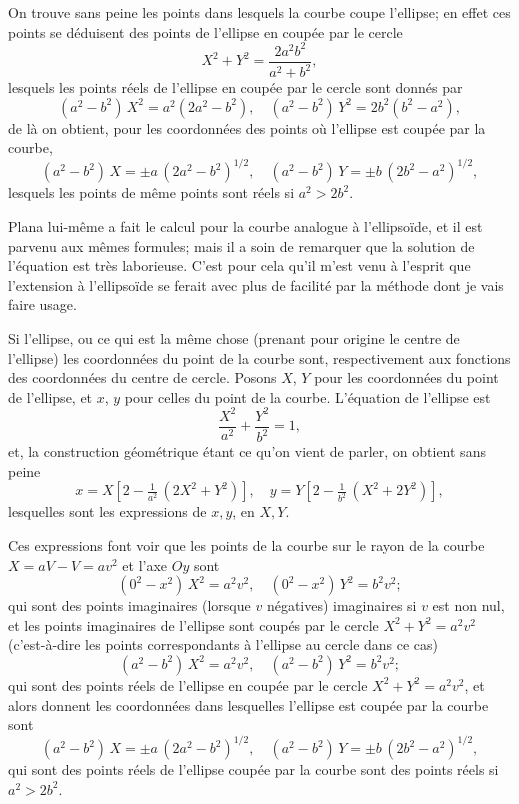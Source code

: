 \documentclass[11pt,a4paper]{article}
\begin{document}
On trouve sans peine les points dans lesquels la courbe coupe l'ellipse; en effet ces points se déduisent des points de l'ellipse en coupée par le cercle
\[
X^2 + Y^2 = \frac{2a^2b^2}{a^2+b^2},
\]
lesquels les points réels de l'ellipse en coupée par le cercle sont donnés par
\[
(a^2-b^2)\,X^2 = a^2(2a^2-b^2),\quad (a^2-b^2)\,Y^2 = 2b^2(b^2-a^2),
\]
de là on obtient, pour les coordonnées des points où l'ellipse est coupée par la courbe,
\[
(a^2-b^2)\,X = \pm a\,(2a^2-b^2)^{1/2},\quad (a^2-b^2)\,Y = \pm b\,(2b^2-a^2)^{1/2},
\]
lesquels les points de même points sont réels si $a^2 > 2b^2$.

Plana lui-même a fait le calcul pour la courbe analogue à l'ellipsoïde, et il est parvenu aux mêmes formules; mais il a soin de remarquer que la solution de l'équation est très laborieuse. C'est pour cela qu'il m'est venu à l'esprit que l'extension à l'ellipsoïde se ferait avec plus de facilité par la méthode dont je vais faire usage.

\setcounter{page}{124}

Si l'ellipse, ou ce qui est la même chose (prenant pour origine le centre de l'ellipse) les coordonnées du point de la courbe sont, respectivement aux fonctions des coordonnées du centre de cercle. Posons $X$, $Y$ pour les coordonnées du point de l'ellipse, et $x$, $y$ pour celles du point de la courbe. L'équation de l'ellipse est
\[
\frac{X^2}{a^2} + \frac{Y^2}{b^2} = 1,
\]
et, la construction géométrique étant ce qu'on vient de parler, on obtient sans peine
\[
x = X\left[2-\tfrac{1}{a^2}\,(2X^2+Y^2)\right],\quad y = Y\left[2-\tfrac{1}{b^2}\,(X^2+2Y^2)\right],
\]
lesquelles sont les expressions de $x, y$, en $X, Y$.

Ces expressions font voir que les points de la courbe sur le rayon de la courbe $X = aV - V = av^2$ et l'axe $Oy$ sont
\[
(0^2 - x^2)\,X^2 = a^2v^2,\quad (0^2-x^2)\,Y^2 = b^2v^2;
\]
qui sont des points imaginaires (lorsque $v$ négatives) imaginaires si $v$ est non nul, et les points imaginaires de l'ellipse sont coupés par le cercle $X^2 + Y^2 = a^2v^2$ (c'est-à-dire les points correspondants à l'ellipse au cercle dans ce cas)
\[
(a^2-b^2)\,X^2 = a^2v^2,\quad (a^2-b^2)\,Y^2 = b^2v^2;
\]
qui sont des points réels de l'ellipse en coupée par le cercle $X^2 + Y^2 = a^2v^2$, et alors donnent les coordonnées dans lesquelles l'ellipse est coupée par la courbe sont
\[
(a^2-b^2)\,X = \pm a\,(2a^2-b^2)^{1/2},\quad (a^2-b^2)\,Y = \pm b\,(2b^2-a^2)^{1/2},
\]
qui sont des points réels de l'ellipse coupée par la courbe sont des points réels si $a^2 > 2b^2$.
\end{document}
